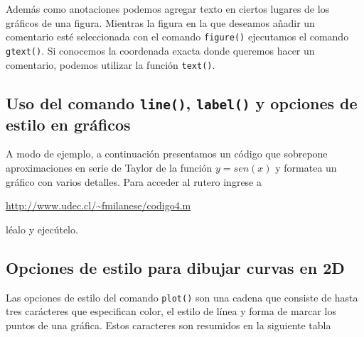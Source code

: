 \documentclass[11pt]{article}
\begin{document}
     Adem\'as como anotaciones podemos agregar texto en ciertos lugares de los gr\'aficos de una figura. Mientras 
     la figura en la que deseamos añadir un comentario est\'e seleccionada con el comando \texttt{figure()} ejecutamos el 
     comando \texttt{gtext()}. Si conocemos la coordenada exacta donde queremos hacer un comentario, podemos 
     utilizar la funci\'on \texttt{text()}.
     
     \subsection{Uso del comando \texttt{line()}, \texttt{label()} y opciones de estilo en gr\'aficos}
     
     A modo de ejemplo, a continuaci\'on presentamos un c\'odigo que sobrepone aproximaciones 
     en serie de Taylor de la funci\'on $y=sen(x)$ y formatea un gr\'afico con varios detalles.
     Para acceder al rutero ingrese a

     \url{http://www.udec.cl/~fmilanese/codigo4.m}
     
      l\'ealo y ejec\'utelo.
      
      \subsection{Opciones de estilo para dibujar curvas en 2D}

      Las opciones de estilo del comando \texttt{plot()} son una cadena que consiste de hasta tres 
      car\'acteres que especifican color, el estilo de l\'inea y forma de marcar los puntos de una gr\'afica.
      Estos caracteres son resumidos en la siguiente tabla
      
\end{document}
